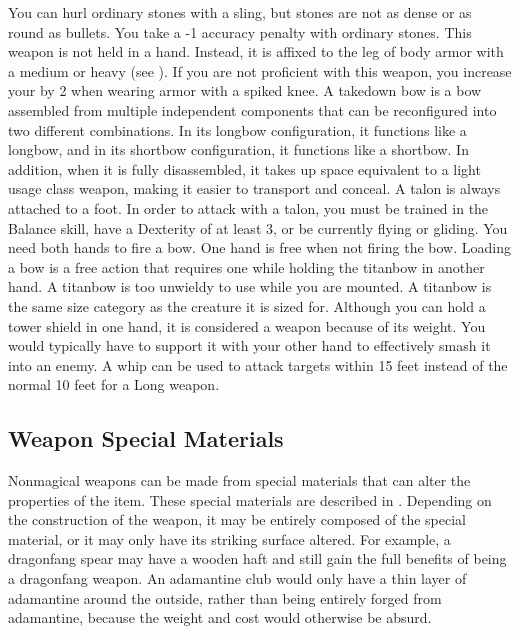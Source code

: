         \par You can hurl ordinary stones with a sling, but stones are not as dense or as round as bullets. You take a -1 accuracy penalty with ordinary stones.
         This weapon is not held in a hand.
        Instead, it is affixed to the leg of body armor with a medium or heavy  (see ).
        If you are not proficient with this weapon, you increase your  by 2 when wearing armor with a spiked knee.
         A takedown bow is a bow assembled from multiple independent components that can be reconfigured into two different combinations.
        In its longbow configuration, it functions like a longbow, and in its shortbow configuration, it functions like a shortbow.
        In addition, when it is fully disassembled, it takes up space equivalent to a light usage class weapon, making it easier to transport and conceal.
         A talon is always attached to a foot.
        In order to attack with a talon, you must be trained in the Balance skill, have a Dexterity of at least 3, or be currently flying or gliding.
         You need both hands to fire a bow. One hand is free when not firing the bow. Loading a bow is a free action that requires one  while holding the titanbow in another hand. A titanbow is too unwieldy to use while you are mounted.
        A titanbow is the same size category as the creature it is sized for.
         Although you can hold a tower shield in one hand, it is considered a  weapon because of its weight.
        You would typically have to support it with your other hand to effectively smash it into an enemy.
         A whip can be used to attack targets within 15 feet instead of the normal 10 feet for a Long weapon.

    \subsection{Weapon Special Materials}\label{Weapon Special Materials}
        Nonmagical weapons can be made from special materials that can alter the properties of the item.
        These special materials are described in .
        Depending on the construction of the weapon, it may be entirely composed of the special material, or it may only have its striking surface altered.
        For example, a dragonfang spear may have a wooden haft and still gain the full benefits of being a dragonfang weapon.
        An adamantine club would only have a thin layer of adamantine around the outside, rather than being entirely forged from adamantine, because the weight and cost would otherwise be absurd.


